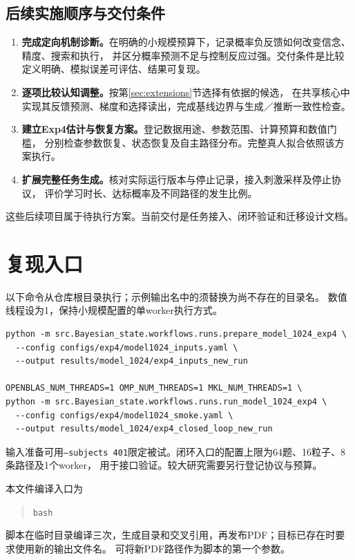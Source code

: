 \documentclass[11pt,a4paper]{article}
\numberwithin{equation}{section}
\begin{document}
\subsection{后续实施顺序与交付条件}
\begin{enumerate}
\item \textbf{完成定向机制诊断。}在明确的小规模预算下，记录概率负反馈如何改变信念、精度、搜索和执行，
并区分概率预测不足与控制反应过强。交付条件是比较定义明确、模拟误差可评估、结果可复现。
\item \textbf{逐项比较认知调整。}按第\ref{sec:extensions}节选择有依据的候选，
在共享核心中实现其反馈预测、梯度和选择读出，完成基线边界与生成／推断一致性检查。
\item \textbf{建立Exp4估计与恢复方案。}登记数据用途、参数范围、计算预算和数值门槛，
分别检查参数恢复、状态恢复及自主路径分布。完整真人拟合依照该方案执行。
\item \textbf{扩展完整任务生成。}核对实际运行版本与停止记录，接入刺激采样及停止协议，
评价学习时长、达标概率及不同路径的发生比例。
\end{enumerate}
这些后续项目属于待执行方案。当前交付是任务接入、闭环验证和迁移设计文档。

\appendix
\section{复现入口}
\label{app:commands}
以下命令从仓库根目录执行；示例输出名中的须替换为尚不存在的目录名。
数值线程设为1，保持小规模配置的单worker执行方式。

{\small
\begin{verbatim}
python -m src.Bayesian_state.workflows.runs.prepare_model_1024_exp4 \
  --config configs/exp4/model1024_inputs.yaml \
  --output results/model_1024/exp4_inputs_new_run

OPENBLAS_NUM_THREADS=1 OMP_NUM_THREADS=1 MKL_NUM_THREADS=1 \
python -m src.Bayesian_state.workflows.runs.run_model_1024_exp4 \
  --config configs/exp4/model1024_smoke.yaml \
  --output results/model_1024/exp4_closed_loop_new_run
\end{verbatim}}

输入准备可用\texttt{--subjects 401}限定被试。闭环入口的配置上限为64题、16粒子、8条路径及1个worker，
用于接口验证。较大研究需要另行登记协议与预算。

本文件编译入口为
\begin{quote}\small
\texttt{bash\ }
\end{quote}
脚本在临时目录编译三次，生成目录和交叉引用，再发布PDF；目标已存在时要求使用新的输出文件名。
可将新PDF路径作为脚本的第一个参数。
\end{document}

